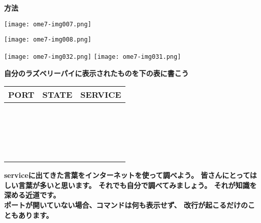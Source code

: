 {\bfseries 方法}

\centering
\texttt{[image: ome7-img007.png]}

\centering
\texttt{[image: ome7-img008.png]}
\flushleft


\clearpage

\centering
\texttt{[image: ome7-img032.png]}
\texttt{[image: ome7-img031.png]}
\flushleft

{\bfseries 自分のラズベリーパイに表示されたものを下の表に書こう}

\begin{flushleft}
	\tablefirsthead{}
	\tablehead{}
	\tabletail{}
	\tablelasttail{}
	\begin{supertabular}{|m{5.467cm}|m{5.4690003cm}|m{5.155cm}|}
		\hline
		PORT & STATE & SERVICE\\\hline
		~ &	~ & ~ \\\hline
		~ &	~ & ~ \\\hline
		~ &	~ & ~ \\\hline
		~ &	~ & ~ \\\hline
	\end{supertabular}
\end{flushleft}
{\bfseries
serviceに出てきた言葉をインターネットを使って調べよう。
皆さんにとってはしい言葉が多いと思います。
それでも自分で調べてみましょう。
それが知識を深める近道です。\\
ポートが開いていない場合、コマンドは何も表示せず、
改行が起こるだけのこともあります。
}
